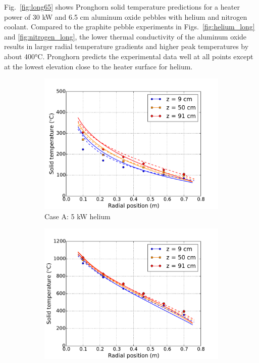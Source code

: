 Fig.\ \ref{fig:long65} shows Pronghorn solid temperature predictions for a heater power of 30 \si{\kilo\watt} and 6.5 \si{\centi\meter} aluminum oxide pebbles with helium and nitrogen coolant. Compared to the graphite pebble experiments in Figs.\ \ref{fig:helium_long} and \ref{fig:nitrogen_long}, the lower thermal conductivity of the aluminum oxide results in larger radial temperature gradients and higher peak temperatures by about 400\si{\celsius}. Pronghorn predicts the experimental data well at all points except at the lowest elevation close to the heater surface for helium.

\begin{figure}[h!]
    \begin{subfigure}{0.5\linewidth}
        \centering
        \includegraphics[height=0.75\linewidth]{figs/exp_total_A.pdf}
       \caption{Case A: 5 \si{\kilo\watt} helium}
       \label{fig:helium_longa}
    \end{subfigure}
    \begin{subfigure}{0.5\linewidth}
        \centering
        \includegraphics[height=0.75\linewidth]{figs/exp_total_F.pdf}

\end{subfigure}
\end{figure}
